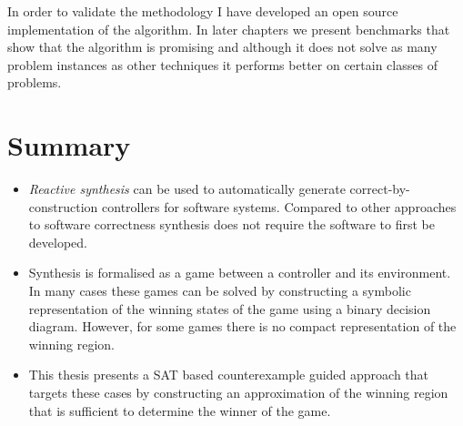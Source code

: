 In order to validate the methodology I have developed an open source implementation of the algorithm. In later chapters we present benchmarks that show that the algorithm is promising and although it does not solve as many problem instances as other techniques it performs better on certain classes of problems.


\section{Summary}

\begin{itemize}

    \item \emph{Reactive synthesis} can be used to automatically generate correct-by-construction controllers for software systems. Compared to other approaches to software correctness synthesis does not require the software to first be developed.

    \item Synthesis is formalised as a game between a controller and its environment. In many cases these games can be solved by constructing a symbolic representation of the winning states of the game using a binary decision diagram. However, for some games there is no compact representation of the winning region.

    \item This thesis presents a SAT based counterexample guided approach that targets these cases by constructing an approximation of the winning region that is sufficient to determine the winner of the game.

\end{itemize}




